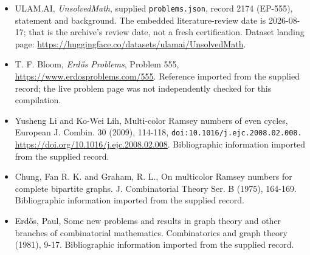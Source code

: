 \documentclass[11pt,a4paper]{article}
\begin{document}
{\small

\begin{itemize}

\item[\hypertarget{source:2174:1}{S1}] ULAM.AI, \emph{UnsolvedMath}, supplied \texttt{problems.json}, record 2174 (EP-555), statement and background. The embedded literature-review date is 2026-08-17; that is the archive’s review date, not a fresh certification. Dataset landing page: \url{https://huggingface.co/datasets/ulamai/UnsolvedMath}.

\item[\hypertarget{source:2174:2}{S2}] T. F. Bloom, \emph{Erdős Problems}, Problem 555, \url{https://www.erdosproblems.com/555}. Reference imported from the supplied record; the live problem page was not independently checked for this compilation.

\item[\hypertarget{source:2174:3}{S3}] Yusheng Li and Ko-Wei Lih, Multi-color Ramsey numbers of even cycles, European J. Combin. 30 (2009), 114-118, \nolinkurl{doi:10.1016/j.ejc.2008.02.008.} \url{https://doi.org/10.1016/j.ejc.2008.02.008}. Bibliographic information imported from the supplied record.

\item[\hypertarget{source:2174:4}{S4}] Chung, Fan R. K. and Graham, R. L., On multicolor Ramsey numbers for complete bipartite graphs. J. Combinatorial Theory Ser. B (1975), 164-169. Bibliographic information imported from the supplied record.

\item[\hypertarget{source:2174:5}{S5}] Erd\H{o}s, Paul, Some new problems and results in graph theory and other branches of combinatorial mathematics. Combinatorics and graph theory (1981), 9-17. Bibliographic information imported from the supplied record.

\end{itemize}

}

\label{end:2174}
\end{document}
